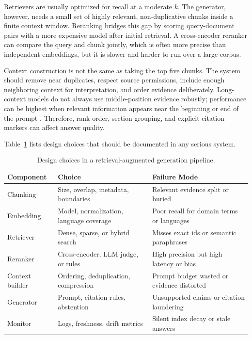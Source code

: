 Retrievers are usually optimized for recall at a moderate $k$. The generator, however, needs a small set of highly relevant, non-duplicative chunks inside a finite context window. Reranking bridges this gap by scoring query-document pairs with a more expensive model after initial retrieval. A cross-encoder reranker can compare the query and chunk jointly, which is often more precise than independent embeddings, but it is slower and harder to run over a large corpus.

Context construction is not the same as taking the top five chunks. The system should remove near duplicates, respect source permissions, include enough neighboring context for interpretation, and order evidence deliberately. Long-context models do not always use middle-position evidence robustly; performance can be highest when relevant information appears near the beginning or end of the prompt \cite{liu2023lost}. Therefore, rank order, section grouping, and explicit citation markers can affect answer quality.

Table~\ref{tab:rag-design-choices} lists design choices that should be documented in any serious \rag system.

\begin{table}[t]
\caption{Design choices in a retrieval-augmented generation pipeline.}
\label{tab:rag-design-choices}
\small
\begin{tabular}{@{}p{2.5cm}p{4.2cm}p{4.8cm}@{}}
\toprule
Component & Choice & Failure Mode \\
\midrule
Chunking & Size, overlap, metadata, boundaries & Relevant evidence split or buried \\
Embedding & Model, normalization, language coverage & Poor recall for domain terms or languages \\
Retriever & Dense, sparse, or hybrid search & Misses exact ids or semantic paraphrases \\
Reranker & Cross-encoder, LLM judge, or rules & High precision but high latency or bias \\
Context builder & Ordering, deduplication, compression & Prompt budget wasted or evidence distorted \\
Generator & Prompt, citation rules, abstention & Unsupported claims or citation laundering \\
Monitor & Logs, freshness, drift metrics & Silent index decay or stale answers \\
\bottomrule
\end{tabular}
\end{table}

